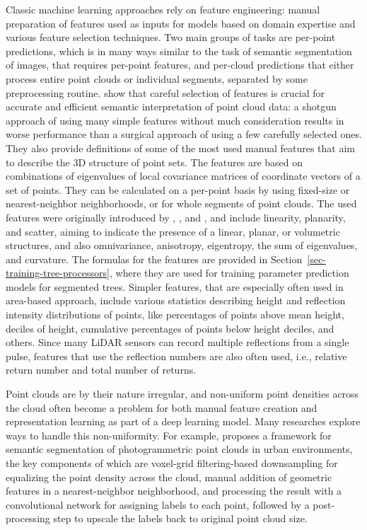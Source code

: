 Classic machine learning approaches rely on feature engineering: manual preparation of features used as inputs for models based on domain expertise and various feature selection techniques.
Two main groups of tasks are per-point predictions, which is in many ways similar to the task of semantic segmentation of images, that requires per-point features, and per-cloud predictions that either process entire point clouds or individual segments, separated by some preprocessing routine.
\citet{weinmannFeatureRelevanceAssessment2013} show that careful selection of features is crucial for accurate and efficient semantic interpretation of point cloud data: a shotgun approach of using many simple features without much consideration results in worse performance than a surgical approach of using a few carefully selected ones.
They also provide definitions of some of the most used manual features that aim to describe the 3D structure of point sets.
The features are based on combinations of eigenvalues of local covariance matrices of coordinate vectors of a set of points.
They can be calculated on a per-point basis by using fixed-size or nearest-neighbor neighborhoods, or for whole segments of point clouds.
The used features were originally introduced by \citet{westContextdrivenAutomatedTarget2004}, \citet{paulyEfficientSimplificationPointsampled2002}, and \citet{malletRelevanceAssessmentFullwaveform2011}, and include linearity, planarity, and scatter, aiming to indicate the presence of a linear, planar, or volumetric structures, and also omnivariance, anisotropy, eigentropy, the sum of eigenvalues, and curvature.
The formulas for the features are provided in Section~\ref{sec-training-tree-processors}, where they are used for training parameter prediction models for segmented trees.
Simpler features, that are especially often used in area-based approach, include various statistics describing height and reflection intensity distributions of points, like percentages of points above mean height, deciles of height, cumulative percentages of points below height deciles, and others.
Since many LiDAR sensors can record multiple reflections from a single pulse, features that use the reflection numbers are also often used, i.e., relative return number and total number of returns.

Point clouds are by their nature irregular, and non-uniform point densities across the cloud often become a problem for both manual feature creation and representation learning as part of a deep learning model.
Many researches explore ways to handle this non-uniformity.
For example, \citet{ozdemirDeepLearningFramework2021} proposes a framework for semantic segmentation of photogrammetric point clouds in urban environments, the key components of which are voxel-grid filtering-based downsampling for equalizing the point density across the cloud, manual addition of geometric features in a nearest-neighbor neighborhood, and processing the result with a convolutional network for assigning labels to each point, followed by a post-processing step to upscale the labels back to original point cloud size.

